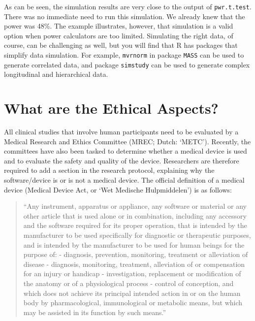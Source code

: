 \documentclass[]{book}
\begin{document}
As can be seen, the simulation results are very close to the output of
\texttt{pwr.t.test}. There was no immediate need to run this simulation.
We already knew that the power was 48\%. The example illustrates,
however, that simulation is a valid option when power calculators are
too limited. Simulating the right data, of course, can be challenging as
well, but you will find that R has packages that simplify data
simulation. For example, \texttt{mvrnorm} in package \texttt{MASS}
\citep{Venables2002} can be used to generate correlated data, and
package \texttt{simstudy} \citep{R-simstudy} can be used to generate
complex longitudinal and hierarchical data.

\section{What are the Ethical
Aspects?}\label{what-are-the-ethical-aspects}


All clinical studies that involve human participants need to be
evaluated by a Medical Research and Ethics Committee (MREC; Dutch:
`METC'). Recently, the committees have also been tasked to determine
whether a medical device is used and to evaluate the safety and quality
of the device. Researchers are therefore required to add a section in
the research protocol, explaining why the software/device is or is not a
medical device. The official definition of a medical device (Medical
Device Act, or `Wet Medische Hulpmiddelen') is as follows:

\begin{quote}
``Any instrument, apparatus or appliance, any software or material or
any other article that is used alone or in combination, including any
accessory and the software required for its proper operation, that is
intended by the manufacturer to be used specifically for diagnostic or
therapeutic purposes, and is intended by the manufacturer to be used for
human beings for the purpose of: - diagnosis, prevention, monitoring,
treatment or alleviation of disease - diagnosis, monitoring, treatment,
alleviation of or compensation for an injury or handicap -
investigation, replacement or modification of the anatomy or of a
physiological process - control of conception, and which does not
achieve its principal intended action in or on the human body by
pharmacological, immunological or metabolic means, but which may be
assisted in its function by such means.'' \citep{ccmo_meddev}
\end{quote}
\end{document}
